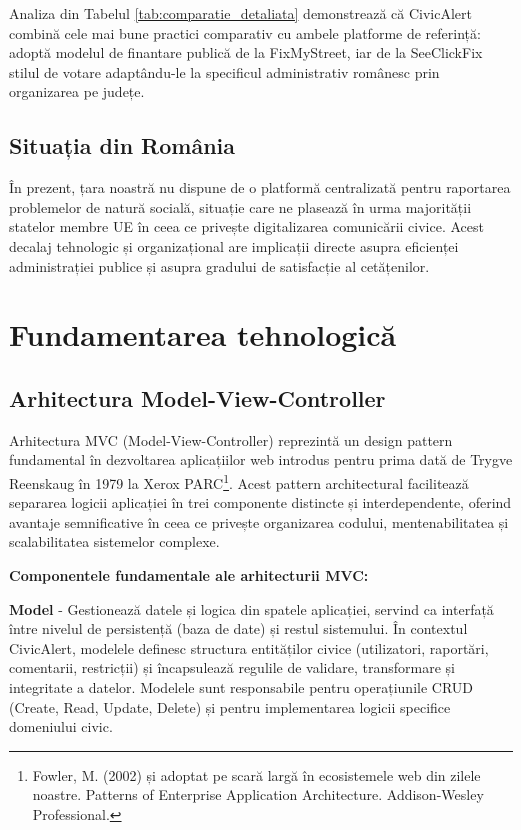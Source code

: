 \documentclass[12pt,a4paper]{report}
\begin{document}
Analiza din Tabelul \ref{tab:comparatie_detaliata} demonstrează că CivicAlert combină cele mai bune practici comparativ cu  ambele platforme de referință: adoptă modelul de finantare publică de la FixMyStreet, iar  de la SeeClickFix stilul de votare  adaptându-le la specificul administrativ românesc prin organizarea pe județe.

\subsection{Situația din România}

În prezent, țara noastră nu dispune de o platformă centralizată pentru raportarea problemelor de natură socială, situație care ne plasează  în urma majorității statelor membre UE în ceea ce privește digitalizarea comunicării civice. Acest decalaj tehnologic și organizațional are implicații directe asupra eficienței administrației publice și asupra gradului de satisfacție al cetățenilor.

\section{Fundamentarea tehnologică}

\subsection{Arhitectura Model-View-Controller}

Arhitectura MVC (Model-View-Controller) reprezintă un design pattern fundamental în dezvoltarea aplicațiilor web introdus pentru prima dată de Trygve Reenskaug în 1979 la Xerox PARC\footnote{Fowler, M. (2002) și adoptat pe scară largă în ecosistemele web din zilele noastre. Patterns of Enterprise Application Architecture. Addison-Wesley Professional.}. Acest pattern architectural facilitează separarea logicii aplicației în trei componente distincte și interdependente, oferind avantaje semnificative în ceea ce privește organizarea codului, mentenabilitatea și scalabilitatea sistemelor complexe.

\textbf{Componentele fundamentale ale arhitecturii MVC:}

\textbf{Model} - Gestionează datele și logica din spatele aplicației, servind ca interfață între nivelul de persistență (baza de date) și restul sistemului. În contextul CivicAlert, modelele definesc structura entităților civice (utilizatori, raportări, comentarii, restricții) și încapsulează regulile de validare, transformare și integritate a datelor. Modelele sunt responsabile pentru operațiunile CRUD (Create, Read, Update, Delete) și pentru implementarea logicii specifice domeniului civic.
\end{document}
